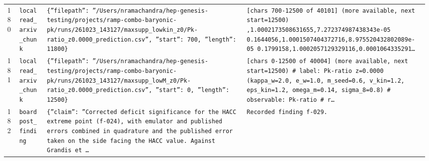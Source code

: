 \documentclass[11pt,a4paper]{article}
\begin{document}
\begin{longtable}{@{}p{}p{}p{}p{}@{}}
180 & \texttt{local}\newline\texttt{read\_\allowbreak{}arxiv\_\allowbreak{}chunk} & \texttt{\{''filepath'':\allowbreak{} ''/\allowbreak{}Users/\allowbreak{}nramachandra/\allowbreak{}hep-genesis-testing/\allowbreak{}projects/\allowbreak{}ramp-combo-baryonic-pk/\allowbreak{}runs/\allowbreak{}261023\_\allowbreak{}143127/\allowbreak{}maxsupp\_\allowbreak{}lowkin\_\allowbreak{}z0/\allowbreak{}Pk-ratio\_\allowbreak{}z0.0000\_\allowbreak{}prediction.csv'',\allowbreak{} ''start'':\allowbreak{} 700,\allowbreak{} ''length'':\allowbreak{} 11800\}\allowbreak{}} & \texttt{[chars 700-12500 of 40101]\allowbreak{} (more available,\allowbreak{} next start=\allowbreak{}12500)\allowbreak{}  ,\allowbreak{}1.0002173508631655,\allowbreak{}7.272374987438343e-05 0.1644056,\allowbreak{}1.0001507404372716,\allowbreak{}8.975520432802089e-05 0.1799158,\allowbreak{}1.0002057129329116,\allowbreak{}0.0001064335291\ldots{}\allowbreak{}} \\
181 & \texttt{local}\newline\texttt{read\_\allowbreak{}arxiv\_\allowbreak{}chunk} & \texttt{\{''filepath'':\allowbreak{} ''/\allowbreak{}Users/\allowbreak{}nramachandra/\allowbreak{}hep-genesis-testing/\allowbreak{}projects/\allowbreak{}ramp-combo-baryonic-pk/\allowbreak{}runs/\allowbreak{}261023\_\allowbreak{}143127/\allowbreak{}maxsupp\_\allowbreak{}lowM\_\allowbreak{}z0/\allowbreak{}Pk-ratio\_\allowbreak{}z0.0000\_\allowbreak{}prediction.csv'',\allowbreak{} ''start'':\allowbreak{} 0,\allowbreak{} ''length'':\allowbreak{} 12500\}\allowbreak{}} & \texttt{[chars 0-12500 of 40004]\allowbreak{} (more available,\allowbreak{} next start=\allowbreak{}12500)\allowbreak{}  \# label:\allowbreak{} Pk-ratio z=\allowbreak{}0.0000 (kappa\_\allowbreak{}w=\allowbreak{}2.0,\allowbreak{} e\_\allowbreak{}w=\allowbreak{}1.0,\allowbreak{} m\_\allowbreak{}seed=\allowbreak{}0.6,\allowbreak{} v\_\allowbreak{}kin=\allowbreak{}1.2,\allowbreak{} eps\_\allowbreak{}kin=\allowbreak{}1.2,\allowbreak{} omega\_\allowbreak{}m=\allowbreak{}0.14,\allowbreak{} sigma\_\allowbreak{}8=\allowbreak{}0.8)\allowbreak{} \# observable:\allowbreak{} Pk-ratio \# r\ldots{}\allowbreak{}} \\
182 & \texttt{board}\newline\texttt{post\_\allowbreak{}finding} & \texttt{\{''claim'':\allowbreak{} ''Corrected deficit significance for the HACC extreme point (f-024)\allowbreak{},\allowbreak{} with emulator and published errors combined in quadrature and the published error taken on the side facing the HACC value. Against Grandis et \ldots{}\allowbreak{}} & \texttt{Recorded finding f-029.} \\

\end{longtable}
\end{document}
